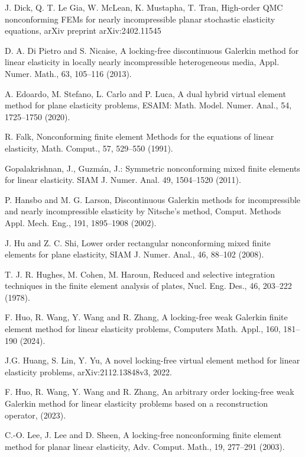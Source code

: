\documentclass[11pt]{article}
\numberwithin{equation}{section}
\begin{document}
\begin{thebibliography}{99.}
 J. Dick, Q. T. Le  Gia, W. McLean, K. Mustapha, T. Tran, High-order QMC nonconforming FEMs for nearly incompressible planar stochastic elasticity equations, arXiv preprint arXiv:2402.11545

 D. A.  Di Pietro and S. Nicaise, A locking-free discontinuous Galerkin method for linear elasticity in locally nearly incompressible heterogeneous media, Appl. Numer. Math., 63, 105--116 (2013).

 A. Edoardo, M. Stefano, L. Carlo and P. Luca,  A dual hybrid virtual element method for plane elasticity problems, ESAIM: Math. Model. Numer. Anal., 54, 1725--1750 (2020).

 R. Falk, Nonconforming finite element Methods for the equations of linear elasticity, Math. Comput., 57, 529--550 (1991).

 Gopalakrishnan, J., Guzm\'an, J.: Symmetric
nonconforming mixed finite elements for linear elasticity. SIAM J. Numer. Anal.
49, 1504–1520 (2011).

 P. Hansbo and  M. G. Larson, Discontinuous Galerkin methods for incompressible and nearly incompressible elasticity by Nitsche’s method, Comput. Methods Appl. Mech. Eng., 191, 1895--1908 (2002).

 J. Hu and Z. C.  Shi,  Lower order rectangular nonconforming mixed finite elements for plane elasticity, SIAM J. Numer. Anal., 46, 88--102 (2008).

  T. J. R. Hughes, M. Cohen, M. Haroun, Reduced and selective integration techniques in the finite element analysis of plates, Nucl. Eng. Des., 46, 203--222 (1978).

  F. Huo, R. Wang, Y. Wang and R. Zhang, A locking-free weak Galerkin finite element method for linear elasticity problems,  Computers   Math. Appl., 160, 181--190 (2024).

  J.G. Huang, S. Lin, Y. Yu, A novel locking-free virtual element method for linear elasticity problems, arXiv:2112.13848v3, 2022.

 F. Huo, R. Wang, Y. Wang and  R. Zhang, An arbitrary order locking-free weak Galerkin method for linear elasticity problems based on a reconstruction operator, (2023).


 C.-O. Lee, J. Lee and  D. Sheen, A locking-free nonconforming finite element method for planar linear elasticity, Adv. Comput. Math., 19, 277--291 (2003).


\end{thebibliography}
\end{document}

